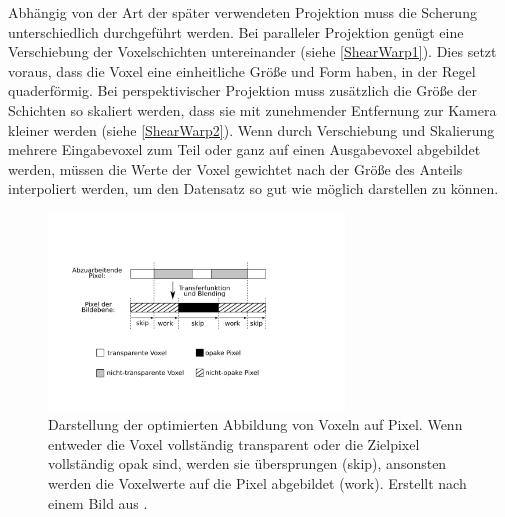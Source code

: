 \documentclass[a4paper,fontsize=12pt,toc=bib,parskip=half,ngerman]{scrartcl}
\begin{document}
Abh\"angig von der Art der sp\"ater verwendeten Projektion muss die Scherung unterschiedlich durchgef\"uhrt werden. Bei paralleler Projektion gen\"ugt eine Verschiebung der Voxelschichten untereinander (siehe \cref{ShearWarp1}). Dies setzt voraus, dass die Voxel eine einheitliche Gr\"o{\ss}e und Form haben, in der Regel quaderf\"ormig. Bei perspektivischer Projektion muss zus\"atzlich die Gr\"o{\ss}e der Schichten so skaliert werden, dass sie mit zunehmender Entfernung zur Kamera kleiner werden (siehe \cref{ShearWarp2}). Wenn durch Verschiebung und Skalierung mehrere Eingabevoxel zum Teil oder ganz auf einen Ausgabevoxel abgebildet werden, m\"ussen die Werte der Voxel gewichtet nach der Gr\"o{\ss}e des Anteils interpoliert werden, um den Datensatz so gut wie m\"oglich darstellen zu k\"onnen.

\begin{figure}
	\centering
	\includegraphics[width=0.7\textwidth]{pictures/Scanline.png}
	\caption{Darstellung der optimierten Abbildung von Voxeln auf Pixel. Wenn entweder die Voxel vollst\"andig transparent oder die Zielpixel vollst\"andig opak sind, werden sie \"ubersprungen (\glq skip\grq{}), ansonsten werden die Voxelwerte auf die Pixel abgebildet (\glq work\grq{}). Erstellt nach einem Bild aus \cite{lacroute1994fast}.}
	\label{Scanline}
\end{figure}
\end{document}
